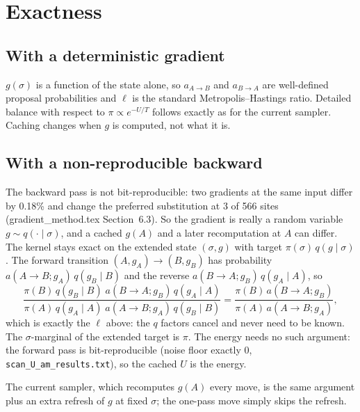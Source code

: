 \documentclass[11pt,a4paper]{article}
\newcommand{\file}[1]{\texttt{#1}}
\begin{document}
\section{Exactness}
\subsection{With a deterministic gradient}
$g(\sigma)$ is a function of the state alone, so $a_{A\to B}$ and $a_{B\to A}$
are well-defined proposal probabilities and $\ell$ is the standard
Metropolis--Hastings ratio. Detailed balance with respect to $\pi\propto e^{-U/T}$
follows exactly as for the current sampler. Caching changes when $g$ is
computed, not what it is.

\subsection{With a non-reproducible backward}
The backward pass is not bit-reproducible: two gradients at the same input
differ by 0.18\% and change the preferred substitution at 3 of 566 sites
(gradient\_method.tex Section~6.3). So the gradient is really a random variable
$g\sim q(\cdot\mid\sigma)$, and a cached $g(A)$ and a later recomputation at $A$
can differ. The kernel stays exact on the extended state $(\sigma,g)$ with
target $\pi(\sigma)\,q(g\mid\sigma)$. The forward transition
$(A,g_A)\to(B,g_B)$ has probability $a(A\to B;g_A)\,q(g_B\mid B)$ and the reverse
$a(B\to A;g_B)\,q(g_A\mid A)$, so
\begin{equation}
  \frac{\pi(B)\,q(g_B\mid B)\;a(B\to A;g_B)\,q(g_A\mid A)}
       {\pi(A)\,q(g_A\mid A)\;a(A\to B;g_A)\,q(g_B\mid B)}
  = \frac{\pi(B)\,a(B\to A;g_B)}{\pi(A)\,a(A\to B;g_A)} ,
\end{equation}
which is exactly the $\ell$ above: the $q$ factors cancel and never need to be
known. The $\sigma$-marginal of the extended target is $\pi$. The energy needs
no such argument: the forward pass is bit-reproducible (noise floor exactly 0,
\file{scan\_U\_am\_results.txt}), so the cached $U$ is the energy.

The current sampler, which recomputes $g(A)$ every move, is the same argument
plus an extra refresh of $g$ at fixed $\sigma$; the one-pass move simply skips
the refresh.
\end{document}
